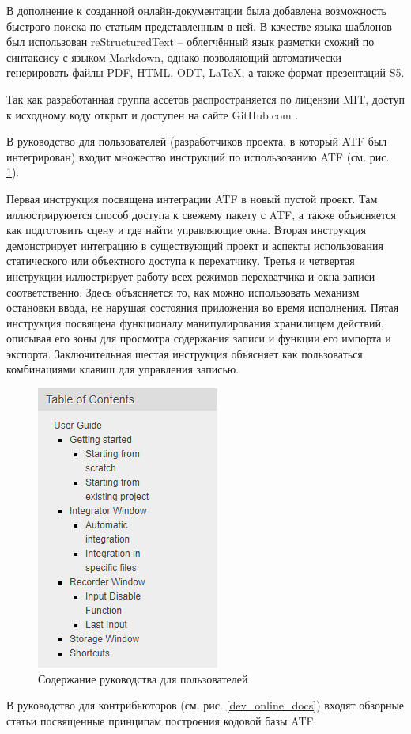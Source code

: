 В дополнение к созданной онлайн-документации была добавлена возможность быстрого поиска по статьям представленным в ней. В качестве языка шаблонов был использован reStructuredText -- облегчённый язык разметки схожий по синтаксису с языком Markdown, однако позволяющий автоматически генерировать файлы PDF, HTML, ODT, LaTeX, а также формат презентаций S5.

Так как разработанная группа ассетов распространяется по лицензии MIT, доступ к исходному коду открыт и доступен на сайте GitHub.com \cite{git}.

В руководство для пользователей (разработчиков проекта, в который ATF был интегрирован) входит множество инструкций по использованию ATF (см. рис. \ref{user_online_docs}). 

Первая инструкция посвящена интеграции ATF в новый пустой проект. Там иллюстрируюется способ доступа к свежему пакету с ATF, а также объясняется как подготовить сцену и где найти управляющие окна. Вторая инструкция демонстрирует интеграцию в существующий проект и аспекты использования статического или объектного доступа к перехатчику. Третья и четвертая инструкции иллюстрирует работу всех режимов перехватчика и окна записи соответственно. Здесь объясняется то, как можно использовать механизм остановки ввода, не нарушая состояния приложения во время исполнения. Пятая инструкция посвящена функционалу манипулирования хранилищем действий, описывая его зоны для просмотра содержания записи и функции его импорта и экспорта. Заключительная шестая инструкция объясняет как пользоваться комбинациями клавиш для управления записью.

\begin{figure}[H]
	\centering
	\includegraphics[width=0.3\linewidth]{user_guide.PNG}
	\caption{Содержание руководства для пользователей}
	\label{user_online_docs}
\end{figure}

В руководство для контрибьюторов (см. рис. \ref{dev_online_docs}) входят обзорные статьи посвященные принципам построения кодовой базы ATF.

